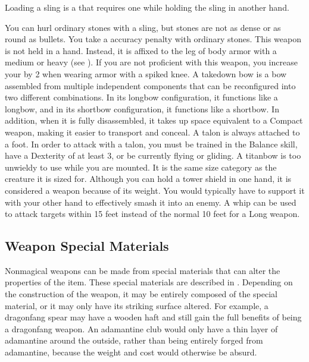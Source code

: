      Loading a sling is a  that requires one  while holding the sling in another hand.
    \par You can hurl ordinary stones with a sling, but stones are not as dense or as round as bullets. You take a  accuracy penalty with ordinary stones.
     This weapon is not held in a hand.
    Instead, it is affixed to the leg of body armor with a medium or heavy  (see ).
    If you are not proficient with this weapon, you increase your  by 2 when wearing armor with a spiked knee.
     A takedown bow is a bow assembled from multiple independent components that can be reconfigured into two different combinations.
    In its longbow configuration, it functions like a longbow, and in its shortbow configuration, it functions like a shortbow.
    In addition, when it is fully disassembled, it takes up space equivalent to a Compact weapon, making it easier to transport and conceal.
     A talon is always attached to a foot.
    In order to attack with a talon, you must be trained in the Balance skill, have a Dexterity of at least 3, or be currently flying or gliding.
     A titanbow is too unwieldy to use while you are mounted.
    It is the same size category as the creature it is sized for.
     Although you can hold a tower shield in one hand, it is considered a  weapon because of its weight.
    You would typically have to support it with your other hand to effectively smash it into an enemy.
     A whip can be used to attack targets within 15 feet instead of the normal 10 feet for a Long weapon.

  \subsection{Weapon Special Materials}\label{Weapon Special Materials}
    Nonmagical weapons can be made from special materials that can alter the properties of the item.
    These special materials are described in .
    Depending on the construction of the weapon, it may be entirely composed of the special material, or it may only have its striking surface altered.
    For example, a dragonfang spear may have a wooden haft and still gain the full benefits of being a dragonfang weapon.
    An adamantine club would only have a thin layer of adamantine around the outside, rather than being entirely forged from adamantine, because the weight and cost would otherwise be absurd.

